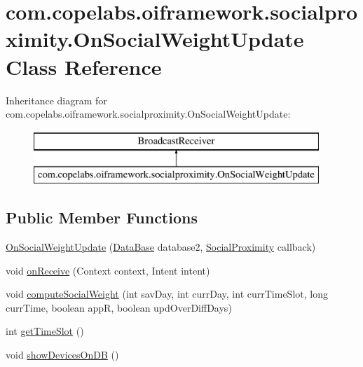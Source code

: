 \hypertarget{classcom_1_1copelabs_1_1oiframework_1_1socialproximity_1_1_on_social_weight_update}{}\section{com.\+copelabs.\+oiframework.\+socialproximity.\+On\+Social\+Weight\+Update Class Reference}
\label{classcom_1_1copelabs_1_1oiframework_1_1socialproximity_1_1_on_social_weight_update}
Inheritance diagram for com.\+copelabs.\+oiframework.\+socialproximity.\+On\+Social\+Weight\+Update\+:\begin{figure}[H]
\begin{center}
\leavevmode
\includegraphics[height=2.000000cm]{classcom_1_1copelabs_1_1oiframework_1_1socialproximity_1_1_on_social_weight_update}
\end{center}
\end{figure}
\subsection*{Public Member Functions}
\begin{DoxyCompactItemize}
\item 
\hyperlink{classcom_1_1copelabs_1_1oiframework_1_1socialproximity_1_1_on_social_weight_update_a6d07da1e7f8c1551f442ef7aef7812e5}{On\+Social\+Weight\+Update} (\hyperlink{classcom_1_1copelabs_1_1oiframework_1_1socialproximity_1_1_data_base}{Data\+Base} database2, \hyperlink{classcom_1_1copelabs_1_1oiframework_1_1socialproximity_1_1_social_proximity}{Social\+Proximity} callback)
\item 
void \hyperlink{classcom_1_1copelabs_1_1oiframework_1_1socialproximity_1_1_on_social_weight_update_aa98a72b523b5b877ecce42ad1c7b324f}{on\+Receive} (Context context, Intent intent)
\item 
void \hyperlink{classcom_1_1copelabs_1_1oiframework_1_1socialproximity_1_1_on_social_weight_update_ae43a3aacd45e60256d75dcd113003a71}{compute\+Social\+Weight} (int sav\+Day, int curr\+Day, int curr\+Time\+Slot, long curr\+Time, boolean app\+R, boolean upd\+Over\+Diff\+Days)
\item 
int \hyperlink{classcom_1_1copelabs_1_1oiframework_1_1socialproximity_1_1_on_social_weight_update_a81d4d2ad2b4bc89781f672a32ab3d523}{get\+Time\+Slot} ()
\item 
void \hyperlink{classcom_1_1copelabs_1_1oiframework_1_1socialproximity_1_1_on_social_weight_update_a89365056e150cd1297ae3118edc6b6f8}{show\+Devices\+On\+D\+B} ()
\end{DoxyCompactItemize}

